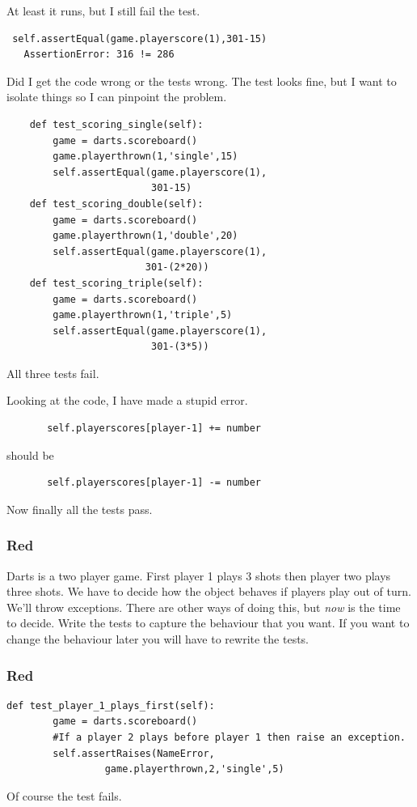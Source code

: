 \documentclass{beamer}
\begin{document}
\begin{frame}[fragile]
At least it runs, but I still fail the test.
\begin{verbatim}
 self.assertEqual(game.playerscore(1),301-15)
   AssertionError: 316 != 286
\end{verbatim}
Did I get the code wrong or the tests wrong. The test looks fine, but
I want to isolate things so I can pinpoint the problem. 
\end{frame}
\begin{frame}[fragile]
\begin{lstlisting}
    def test_scoring_single(self):
        game = darts.scoreboard()
        game.playerthrown(1,'single',15)
        self.assertEqual(game.playerscore(1),
                         301-15)
    def test_scoring_double(self):
        game = darts.scoreboard()
        game.playerthrown(1,'double',20)
        self.assertEqual(game.playerscore(1),
                        301-(2*20))
    def test_scoring_triple(self):
        game = darts.scoreboard()
        game.playerthrown(1,'triple',5)
        self.assertEqual(game.playerscore(1),
                         301-(3*5))
\end{lstlisting}
 All three tests fail.
\end{frame}
\begin{frame}[fragile]
  Looking at the code, I have made a stupid error.
\begin{lstlisting}
       self.playerscores[player-1] += number
\end{lstlisting}
should be
\begin{lstlisting}
       self.playerscores[player-1] -= number
\end{lstlisting}
Now finally all the tests pass.
\end{frame}
\begin{frame}[fragile]
\frametitle{Red}
Darts is a two player game. First player 1 plays 3 shots then player
two plays three shots. We have to decide how the object behaves if
players play out of turn. We'll throw exceptions. There are other ways
of doing this, but {\em now} is the time to decide. Write the tests to
capture the behaviour that you want. If you want to change the
behaviour later you will have to rewrite the tests.

\end{frame}
\begin{frame}[fragile]
\frametitle{Red}
\begin{lstlisting}
def test_player_1_plays_first(self):
        game = darts.scoreboard()
        #If a player 2 plays before player 1 then raise an exception.
        self.assertRaises(NameError, 
                 game.playerthrown,2,'single',5)   
\end{lstlisting}
Of course the test fails.
  
\end{frame}
\end{document}

